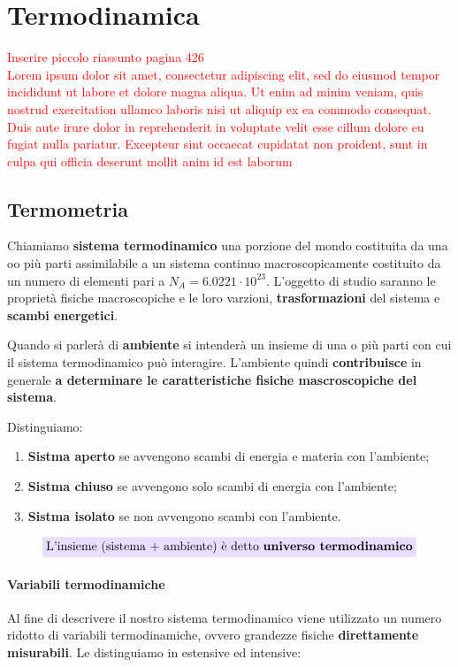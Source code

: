 \documentclass[x11names]{article}
\newcommand{\viola}[1]{\colorbox{yred}{$\displaystyle #1$}}
\begin{document}
	
	
	
\newpage
\section{Termodinamica}
\textcolor{red}{Inserire piccolo riassunto pagina 426}\\

\textcolor{red}{Lorem ipsum dolor sit amet, consectetur adipiscing elit, sed do eiusmod tempor incididunt ut labore et dolore magna aliqua. Ut enim ad minim veniam, quis nostrud exercitation ullamco laboris nisi ut aliquip ex ea commodo consequat. Duis aute irure dolor in reprehenderit in voluptate velit esse cillum dolore eu fugiat nulla pariatur. Excepteur sint occaecat cupidatat non proident, sunt in culpa qui officia deserunt mollit anim id est laborum}


\subsection{Termometria}
Chiamiamo \textbf{sistema termodinamico} una porzione del mondo costituita da una oo più parti assimilabile a un sistema continuo macroscopicamente costituito da un numero di elementi pari a \(N_A = 6.0221 \cdot 10^{23}\). L'oggetto di studio saranno le proprietà fisiche macroscopiche e le loro varzioni, \textbf{trasformazioni} del sistema e \textbf{scambi energetici}.

Quando si parlerà di \textbf{ambiente} si intenderà un insieme di una o più parti con cui il sistema termodinamico può interagire. L'ambiente quindi \textbf{contribuisce} in generale \textbf{a determinare le caratteristiche fisiche mascroscopiche del sistema}.

Distinguiamo:
\begin{enumerate}
	\item \textbf{Sistma aperto} se avvengono scambi di energia e materia con l'ambiente;
	\item \textbf{Sistma chiuso} se avvengono solo scambi di energia con l'ambiente;
	\item \textbf{Sistma isolato} se non avvengono scambi con l'ambiente.
\end{enumerate}

\[ 
\viola{\text{{L'insieme (sistema + ambiente) è detto \textbf{universo termodinamico}}}}
\]
\paragraph{Variabili termodinamiche}
Al fine di descrivere il nostro sistema termodinamico viene utilizzato un numero ridotto di variabili termodinamiche, ovvero grandezze fisiche \textbf{direttamente misurabili}. Le distinguiamo in estensive ed intensive:
\end{document}
